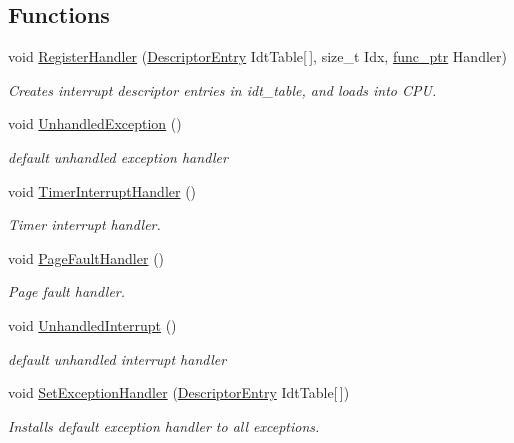 \subsection*{Functions}
\begin{DoxyCompactItemize}
\item 
void \hyperlink{namespace_i_n_t_r_p_a91a6a2668bfa9961a9ed265f6ceac47d}{Register\+Handler} (\hyperlink{union_i_n_t_r_p_1_1_descriptor_entry}{Descriptor\+Entry} Idt\+Table\mbox{[}$\,$\mbox{]}, size\+\_\+t Idx, \hyperlink{ktypes_8h_a46bbb9e776183ed6a8eca9d919756434}{func\+\_\+ptr} Handler)
\begin{DoxyCompactList}\small\item\em Creates interrupt descriptor entries in idt\+\_\+table, and loads into C\+PU. \end{DoxyCompactList}\item 
void \hyperlink{namespace_i_n_t_r_p_a7732859732913734b09dd07030c41991}{Unhandled\+Exception} ()
\begin{DoxyCompactList}\small\item\em default unhandled exception handler \end{DoxyCompactList}\item 
void \hyperlink{namespace_i_n_t_r_p_a0232249076503af19eee46e59a4e5bb8}{Timer\+Interrupt\+Handler} ()
\begin{DoxyCompactList}\small\item\em Timer interrupt handler. \end{DoxyCompactList}\item 
void \hyperlink{namespace_i_n_t_r_p_aff35666b88439353d86e253d3051f27f}{Page\+Fault\+Handler} ()
\begin{DoxyCompactList}\small\item\em Page fault handler. \end{DoxyCompactList}\item 
void \hyperlink{namespace_i_n_t_r_p_a13c03019c9d7b305743516310096a82a}{Unhandled\+Interrupt} ()
\begin{DoxyCompactList}\small\item\em default unhandled interrupt handler \end{DoxyCompactList}\item 
void \hyperlink{namespace_i_n_t_r_p_a4a1a1ff73a4e9bb1c17daf205170daa9}{Set\+Exception\+Handler} (\hyperlink{union_i_n_t_r_p_1_1_descriptor_entry}{Descriptor\+Entry} Idt\+Table\mbox{[}$\,$\mbox{]})
\begin{DoxyCompactList}\small\item\em Installs default exception handler to all exceptions. \end{DoxyCompactList}\item 

\end{DoxyCompactItemize}
